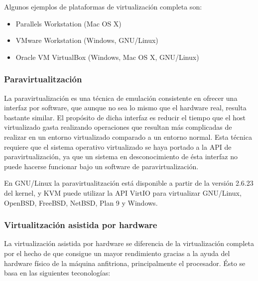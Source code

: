 Algunos ejemplos de plataformas de virtualización completa son:

\begin{itemize}
    \item Parallels Workstation (Mac OS X)
    \item VMware Workstation (Windows, GNU/Linux)
    \item Oracle VM VirtualBox (Windows, Mac OS X, GNU/Linux)
\end{itemize}

\subsubsection{Paravirtualitzación}
\label{subsubsubsec:virt_para}

La paravirtualización es una técnica de emulación consistente en ofrecer una interfaz por software, que aunque no sea lo mismo que el hardware real, resulta bastante similar. El propósito de dicha interfaz es reducir el tiempo que el host virtualizado gasta realizando operaciones que resultan más complicadas de realizar en un entorno virtualizado comparado a un entorno normal. Esta técnica requiere que el sistema operativo virtualizado se haya portado a la API de paravirtualización, ya que un sistema en desconocimiento de ésta interfaz no puede hacerse funcionar bajo un software de paravirtualización.

En GNU/Linux la paravirtualitzación está disponible a partir de la versión 2.6.23 del kernel, y KVM puede utilizar la API VirtIO para virtualizar GNU/Linux, OpenBSD, FreeBSD, NetBSD, Plan 9 y Windows.

\subsubsection{Virtualitzación asistida por hardware}
\label{subsubsubsec:virt_hwassist}

La virtualización asistida por hardware se diferencia de la virtualización completa por el hecho de que consigue un mayor rendimiento gracias a la ayuda del hardware físico de la máquina anfitriona, principalmente el procesador. Ésto se basa en las siguientes teconologías:

